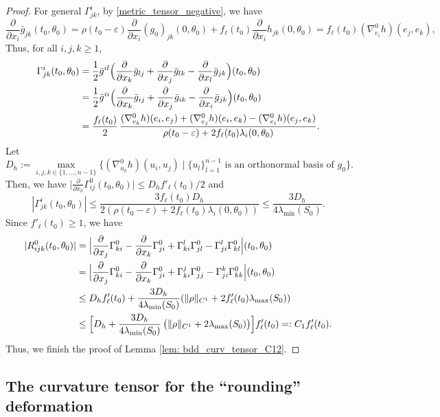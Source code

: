 \documentclass[JEP,XML,SOM,Unicode,NoFloatCountersInSection]{cedram}
\let\sep\mid
\theoremstyle{definition}
\let\eps\varepsilon
\renewcommand{\>}{{\rangle}}
\newcommand{\<}{{\langle}}
\begin{document}
\begin{proof}
For general $\Gamma^i_{jk}$, by \eqref{metric_tensor_negative}, we have
\[
\frac{\partial}{\partial x_i}\bar g_{jk}(t_0,\theta_0)=\rho(t_0-\eps)\frac{\partial}{\partial x_i}(g_0)_{jk}(0,\theta_0)+f_\ell(t_0)\frac{\partial}{\partial x_i}h_{jk} (0,\theta_0)=f_\ell(t_0)(\nabla^0_{e_i}h)(e_j,e_k),
\]
Thus, for all $i,j,k\geq 1$,
\begin{align*}
\Gamma^i_{jk}(t_0,\theta_0) &= \frac{1}{2}\bar g^{il}\Bigl(\frac{\partial}{\partial x_k}\bar g_{lj}+\frac{\partial}{\partial x_j}\bar g_{lk}-\frac{\partial}{\partial x_l}\bar g_{jk}\Bigr)(t_0,\theta_0) \\
&= \frac{1}{2}\bar g^{ii}\Bigl(\frac{\partial}{\partial x_k}\bar g_{ij}+\frac{\partial}{\partial x_j}\bar g_{ik}-\frac{\partial}{\partial x_i}\bar g_{jk}\Bigr)(t_0,\theta_0) \\\
&=\frac{f_\ell(t_0)}{2}\,\frac{(\nabla^0_{e_k}h)(e_i,e_j)+(\nabla^0_{e_j}h)(e_i,e_k)-(\nabla^0_{e_i}h)(e_j,e_k)}{\rho(t_0-\eps)+2f_\ell(t_0)\lambda_i(0,\theta_0)}.
\end{align*}
Let
\[
D_h := \max_{ i,j,k\in\{1,\ldots, n-1\}} \bigl\{(\nabla^0_{u_k}h)(u_i,u_j) \sep\{u_l\}_{l=1}^{n-1} \text{ is an orthonormal basis of }g_0 \bigr\}.
\]
Then, we have $\bigl|\frac{\partial}{\partial x_k}\Gamma^0_{ij}(t_0,\theta_0)\bigr|\leq D_hf'_\ell(t_0)/2$ and
\[
|\Gamma^i_{jk}(t_0,\theta_0)|\leq \frac{3f_\ell(t_0)D_h}{2(\rho(t_0-\eps)+2f_\ell(t_0)\lambda_i(0,\theta_0))}\leq \frac{3D_h}{4\lambda_{\min}(S_0)}.
\]
Since $f'_\ell(t_0)\geq 1$, we have
\begin{align*}
|R^0_{ijk}(t_0,\theta_0)| &= \Bigl|\frac{\partial}{\partial x_j}\Gamma^0_{ki}-\frac{\partial}{\partial x_k}\Gamma^0_{ji}+\Gamma^l_{ki}\Gamma^0_{jl}-\Gamma^l_{ji}\Gamma^0_{kl}\Bigr|(t_0,\theta_0)\\
&= \Bigl|\frac{\partial}{\partial x_j}\Gamma^0_{ki}-\frac{\partial}{\partial x_k}\Gamma^0_{ji}+\Gamma^j_{ki}\Gamma^0_{jj}-\Gamma^k_{ji}\Gamma^0_{kk}\Bigr|(t_0,\theta_0)\\
&\leq D_hf'_\ell(t_0)+\frac{3D_h}{4\lambda_{\min}(S_0)}(\|\rho\|_{C^1}+2f'_\ell(t_0)\lambda_{\max}(S_0))\\
&\leq \Bigl[D_h+\frac{3D_h}{4\lambda_{\min}(S_0)}\,\bigl(\|\rho\|_{C^1}+2\lambda_{\max}(S_0)\bigr)\Bigr]f'_\ell(t_0)=:C_1f'_\ell(t_0).
\end{align*}
Thus, we finish the proof of Lemma \ref{lem: bdd_curv_tensor_C12}.
\end{proof}

\subsection{The curvature tensor for the ``rounding'' deformation}
\end{document}
